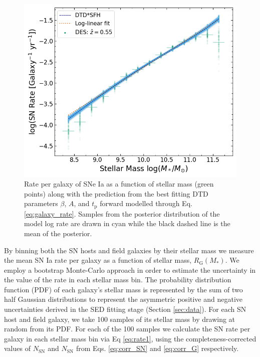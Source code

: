 \documentclass[fleqn,usenatbib]{mnras}
\begin{document}
\begin{figure}
    \centering
    \includegraphics[width=.5\textwidth]{figs/rate_vs_mass_DTD_fit_beta_norm_Qerf1.1.png}
    \caption{Rate per galaxy of SNe Ia as a function of stellar mass (green points) along with the prediction from the best fitting DTD parameters $\beta$, $A$, and $t_{\mathrm{p}}$ forward modelled through Eq. \ref{eq:galaxy_rate}. Samples from the posterior distribution of the model log rate are drawn in cyan while the black dashed line is the mean of the posterior.%
    \label{fig:rate_fitted}}
\end{figure}

By binning both the SN hosts and field galaxies by their stellar mass we measure the mean SN Ia rate per galaxy as a function of stellar mass, $R_{\mathrm{G}}(M_*)$. We employ a bootstrap Monte-Carlo approach in order to estimate the uncertainty in the value of the rate in each stellar mass bin. The probability distribution function (PDF) of each galaxy's stellar mass is represented by the sum of two half Gaussian distributions to represent the asymmetric positive and negative uncertainties derived in the SED fitting stage (Section \ref{sec:data}). For each SN host and field galaxy, we take 100 samples of its stellar mass by drawing at random from its PDF. For each of the 100 samples we calculate the SN rate per galaxy in each stellar mass bin via Eq \ref{eq:rate1}, using the completeness-corrected values of $N_{\mathrm{SN}}$ and $N_{\mathrm{SN}}$ from Eqs. \ref{eq:corr_SN} and \ref{eq:corr_G} respectively. 
\end{document}
